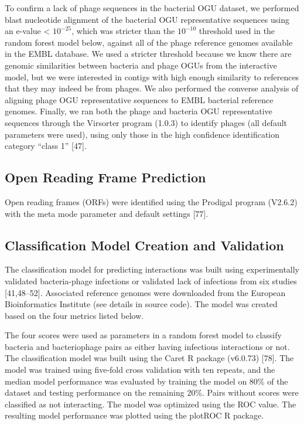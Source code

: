 \documentclass[12pt,]{article}
\begin{document}
To confirm a lack of phage sequences in the bacterial OGU dataset, we
performed blast nucleotide alignment of the bacterial OGU representative
sequences using an e-value \textless{} \(10^{-25}\), which was stricter
than the \(10^{-10}\) threshold used in the random forest model below,
against all of the phage reference genomes available in the EMBL
database. We used a stricter threshold because we know there are genomic
similarities between bacteria and phage OGUs from the interactive model,
but we were interested in contigs with high enough similarity to
references that they may indeed be from phages. We also performed the
converse analysis of aligning phage OGU representative sequences to EMBL
bacterial reference genomes. Finally, we ran both the phage and bacteria
OGU representative sequences through the Virsorter program (1.0.3) to
identify phages (all default parameters were used), using only those in
the high confidence identification category ``class 1'' {[}47{]}.

\subsection{Open Reading Frame
Prediction}\label{open-reading-frame-prediction}

Open reading frames (ORFs) were identified using the Prodigal program
(V2.6.2) with the meta mode parameter and default settings {[}77{]}.

\subsection{Classification Model Creation and
Validation}\label{classification-model-creation-and-validation}

The classification model for predicting interactions was built using
experimentally validated bacteria-phage infections or validated lack of
infections from six studies {[}41,48--52{]}. Associated reference
genomes were downloaded from the European Bioinformatics Institute (see
details in source code). The model was created based on the four metrics
listed below.

The four scores were used as parameters in a random forest model to
classify bacteria and bacteriophage pairs as either having infectious
interactions or not. The classification model was built using the Caret
R package (v6.0.73) {[}78{]}. The model was trained using five-fold
cross validation with ten repeats, and the median model performance was
evaluated by training the model on 80\% of the dataset and testing
performance on the remaining 20\%. Pairs without scores were classified
as not interacting. The model was optimized using the ROC value. The
resulting model performance was plotted using the plotROC R package.
\end{document}
